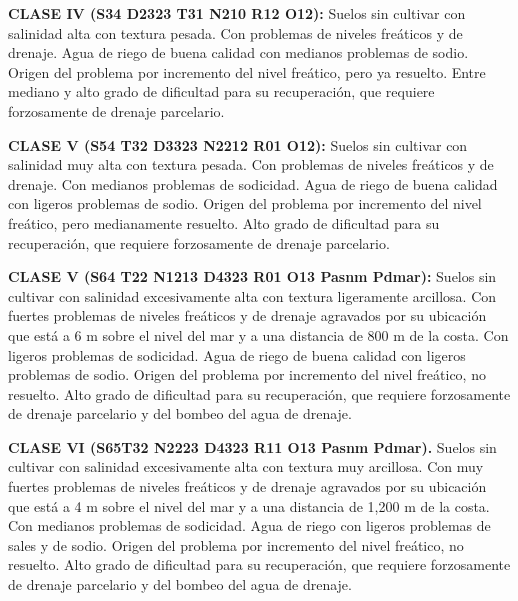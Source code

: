 \begin{example}
    \textbf{CLASE IV (S34 D2323 T31 N210 R12 O12):} Suelos sin cultivar con salinidad alta con textura pesada. Con problemas de niveles freáticos y de drenaje. Agua de riego de buena calidad con medianos problemas de sodio. Origen del problema por incremento del nivel freático, pero ya resuelto. Entre mediano y alto grado de dificultad para su recuperación, que requiere forzosamente de drenaje parcelario.
\end{example}

\begin{example}
    \textbf{CLASE V (S54 T32 D3323 N2212 R01 O12):} Suelos sin cultivar con salinidad muy alta con textura pesada. Con problemas de niveles freáticos y de drenaje. Con medianos problemas de sodicidad. Agua de riego de buena calidad con ligeros problemas de sodio. Origen del problema por incremento del nivel freático, pero medianamente resuelto. Alto grado de dificultad para su recuperación, que requiere forzosamente de drenaje parcelario.
\end{example}

\begin{example}
    \textbf{CLASE V (S64 T22 N1213 D4323 R01 O13 Pasnm Pdmar):} Suelos sin cultivar con salinidad excesivamente alta con textura ligeramente arcillosa. Con fuertes problemas de niveles freáticos y de drenaje agravados por su ubicación que está a 6 m sobre el nivel del mar y a una distancia de 800 m de la costa. Con ligeros problemas de sodicidad. Agua de riego de buena calidad con ligeros problemas de sodio. Origen del problema por incremento del nivel freático, no resuelto. Alto grado de dificultad para su recuperación, que requiere forzosamente de drenaje parcelario y del bombeo del agua de drenaje.
\end{example}

\begin{example}
    \textbf{CLASE VI (S65T32 N2223 D4323 R11 O13 Pasnm Pdmar).} Suelos sin cultivar con salinidad excesivamente alta con textura muy arcillosa. Con muy fuertes problemas de niveles freáticos y de drenaje agravados por su ubicación que está a 4 m sobre el nivel del mar y a una distancia de 1,200 m de la costa. Con medianos problemas de sodicidad. Agua de riego con ligeros problemas de sales y de sodio. Origen del problema por incremento del nivel freático, no resuelto. Alto grado de dificultad para su recuperación, que requiere forzosamente de drenaje parcelario y del bombeo del agua de drenaje.
\end{example}

